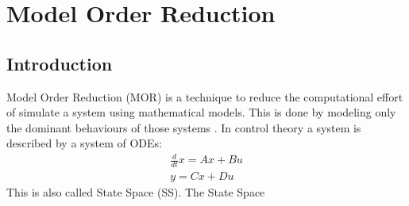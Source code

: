 \chapter{Model Order Reduction}
\section{Introduction}
Model Order Reduction (MOR) is a technique to reduce the computational effort of simulate a system using mathematical models.
This is done by modeling only the dominant behaviours of those systems \cite{+2021}.
In control theory a system is described by a system of ODEs:
\begin{gather}
\frac{d}{dt} x = Ax + Bu \\
y = Cx + Du
\end{gather}
This is also called State Space (SS).
The State Space 


